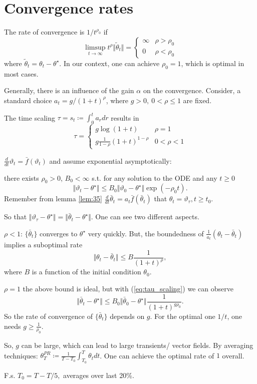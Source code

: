 \section{Convergence rates}

The rate of convergence is \(1/t^{\rho_0}\) if 
\[\limsup_{t\to\infty} t^\rho\Vert \tilde{\theta}_t\Vert = \begin{cases}
    \infty  & \rho>\rho_0\\ 
    0 & \rho<\rho_0
\end{cases}\]
where \(\tilde{\theta}_t=\theta_t-\theta^\star\). In our context, one can achieve \(\rho_0=1\),
which is optimal in most cases.

Generally, there is an influence of the gain \(\alpha\) on the convergence. Consider, a standard 
choice \(a_t=g/(1+t)^\rho\), where \(g>0,\ 0< \rho\leq 1\) are fixed.

The time scaling \(\tau=s_t\coloneqq \int_0^t a_rdr\) results in 
\begin{equation}\label{eq:tau_scaling}\tau=\begin{cases}
    g\log(1+t) & \rho=1\\
    g\frac{1}{1-\rho}(1+t)^{1-\rho} & 0<\rho < 1
\end{cases}\end{equation} 

\(\frac{d}{dt}\vartheta_t=\bar{f}(\vartheta_t)\) and assume exponential asymptotically: 

there exists \(\rho_0>0\), \(B_0<\infty\) s.t. for any solution to the ODE and any \(t\geq 0\)
\[\Vert \vartheta_t-\theta^\star\Vert\leq B_0\Vert \vartheta_0-\theta^\star\Vert \exp(-\rho_0t).\]
Remember from  lemma \ref{lem:35} \(\frac{d}{dt}\bar{\theta}_t=a_t\bar{f}(\bar{\theta}_t)\) that 
\(\theta_t=\vartheta_\tau,t\geq t_0\).

So that \(\Vert \vartheta_\tau-\theta^\star\Vert=\Vert \bar{\theta}_t-\theta^\star\Vert\). One can 
see two different aspects.

\(\rho<1\): \(\{\bar{\theta}_t\}\) converges to \(\theta^\star\) very quickly. But, 
the boundedness of \(\frac{1}{a_t}(\theta_t-\bar{\theta}_t)\) implies a suboptimal rate 
\[\Vert \theta_t-\bar{\theta}_t\Vert\leq B\frac{1}{(1+t)^\rho},\]
where \(B\) is a function of the initial condition \(\theta_0\).

\(\rho=1\) the above bound is ideal, but with (\ref{eq:tau_scaling}) we can observe 
\[\Vert \bar{\theta}_t-\theta^\star\Vert \leq B_0\Vert \bar{\theta}_0-\theta^\star\Vert \frac{1}{(1+t)^{g\rho_0}}.\]
So the rate of convergence of \(\{\bar{\theta}_t\}\) depends on \(g\). For the optimal one \(1/t\), one needs 
\(g\geq \frac{1}{\rho_0}\).

So, \(g\) can be large, which can lead to large transients/ vector fields. By averaging
techniques: \(\theta_T^{PR}\coloneqq \frac{1}{T-T_0}\int_{T_0}^T \theta_tdt\).
One can achieve the optimal rate of \(1\) overall.

F.s. \(T_0=T-T/5,\) averages over last 20\%.






